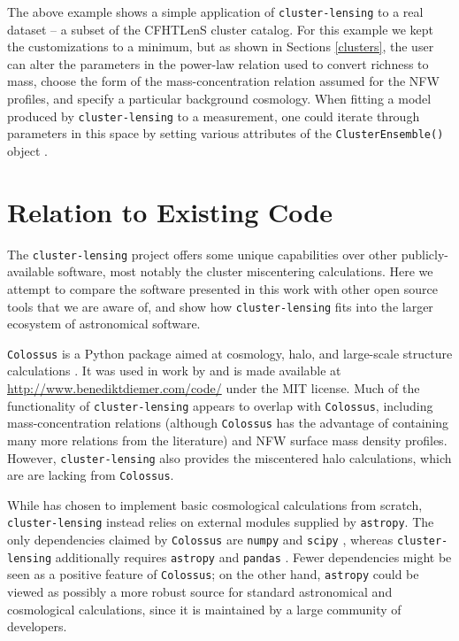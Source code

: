 \documentclass[twocolumn]{aastex6}
\newcommand{\code}{\lstinline[style=codeintext]}
\begin{document}
The above example shows a simple application of \code{cluster-lensing} to a real dataset -- a subset of the CFHTLenS cluster catalog.  For this example we kept the customizations to a minimum, but as shown in Sections \ref{clusters}, the user can alter the parameters in the power-law relation used to convert richness to mass, choose the form of the mass-concentration relation assumed for the NFW profiles, and specify a particular background cosmology. When fitting a model produced by \code{cluster-lensing} to a measurement, one could iterate through parameters in this space by setting various attributes of the \code{ClusterEnsemble()} object \citep[as done, {\it e.g.} in][]{Ford14, Ford15}.


\section{Relation to Existing Code}

The \code{cluster-lensing} project offers some unique capabilities over other publicly-available software, most notably the cluster miscentering calculations. Here we attempt to compare the software presented in this work with other open source tools that we are aware of, and show how \code{cluster-lensing} fits into the larger ecosystem of astronomical software. 

\code{Colossus} is a Python package aimed at cosmology, halo, and large-scale structure calculations \citep{ColossusCode}. It was used in work by \citet{Diemer15} and is made available at \url{http://www.benediktdiemer.com/code/} under the MIT license. Much of the functionality of \code{cluster-lensing} appears to overlap with \code{Colossus}, including mass-concentration relations (although \code{Colossus} has the advantage of containing many more relations from the literature) and NFW surface mass density profiles. However, \code{cluster-lensing} also provides the miscentered halo calculations, which are are lacking from \code{Colossus}.

While \citet{ColossusCode} has chosen to implement basic cosmological calculations from scratch, \code{cluster-lensing} instead relies on external modules supplied by \code{astropy}.  The only dependencies claimed by \code{Colossus} are \code{numpy} \citep{NumPy} and \code{scipy} \citep{SciPy}, whereas \code{cluster-lensing} additionally requires \code{astropy} \citep{astropy13} and \code{pandas} \citep{Pandas}. Fewer dependencies might be seen as a positive feature of \code{Colossus}; on the other hand, \code{astropy} could be viewed as possibly a more robust source for standard astronomical and cosmological calculations, since it is maintained by a large community of developers.
\end{document}

